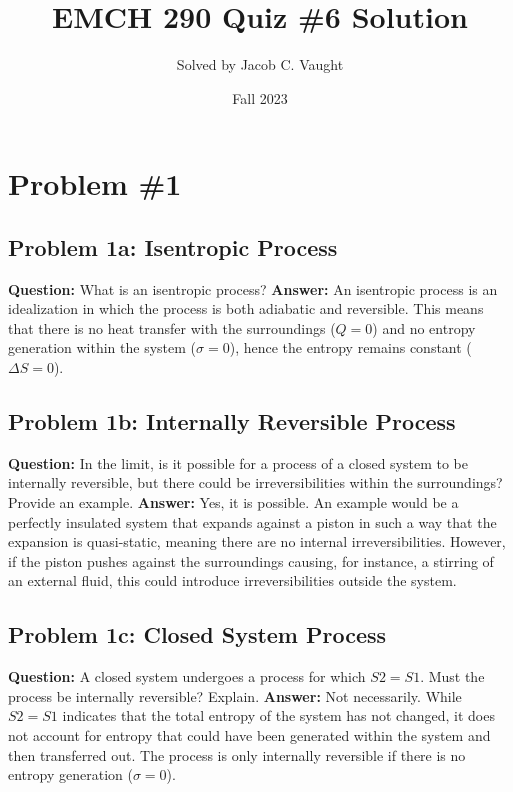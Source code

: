 \documentclass[11pt, letterpaper]{article}
\title{EMCH 290 Quiz \#6 Solution}
\author{Solved by Jacob C. Vaught}
\date{Fall 2023}
\begin{document}
\maketitle

\section*{Problem \#1}
\subsection*{Problem 1a: Isentropic Process}
\textbf{Question:} What is an isentropic process?
\newline\textbf{Answer:} An isentropic process is an idealization in which the process is both adiabatic and reversible. This means that there is no heat transfer with the surroundings (\( Q=0 \)) and no entropy generation within the system (\( \sigma=0 \)), hence the entropy remains constant (\( \Delta S=0 \)).

\subsection*{Problem 1b: Internally Reversible Process}
\textbf{Question:} In the limit, is it possible for a process of a closed system to be internally reversible, but there could be irreversibilities within the surroundings? Provide an example.
\newline\textbf{Answer:} Yes, it is possible. An example would be a perfectly insulated system that expands against a piston in such a way that the expansion is quasi-static, meaning there are no internal irreversibilities. However, if the piston pushes against the surroundings causing, for instance, a stirring of an external fluid, this could introduce irreversibilities outside the system.

\subsection*{Problem 1c: Closed System Process}
\textbf{Question:} A closed system undergoes a process for which \( S2 = S1 \). Must the process be internally reversible? Explain.
\newline\textbf{Answer:} Not necessarily. While \( S2 = S1 \) indicates that the total entropy of the system has not changed, it does not account for entropy that could have been generated within the system and then transferred out. The process is only internally reversible if there is no entropy generation (\( \sigma=0 \)).
\end{document}
